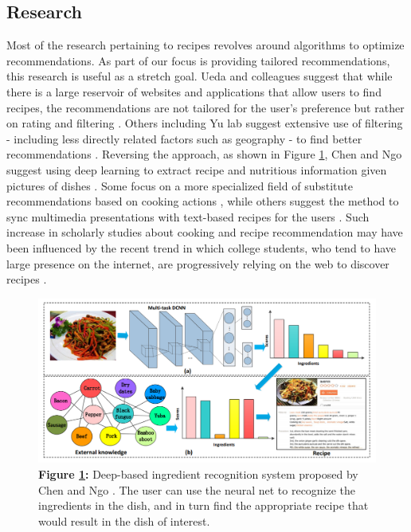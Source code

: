 \documentclass{sigchi}
\begin{document}
\subsection{Research}
	Most of the research pertaining to recipes revolves around algorithms to optimize recommendations. As part of our focus is providing tailored recommendations, this research is useful as a stretch goal. Ueda and colleagues suggest that while there is a large reservoir of websites and applications that allow users to find recipes, the recommendations are not tailored for the user's preference but rather on rating and filtering \cite{ueda}. Others including Yu lab suggest extensive use of filtering - including less directly related factors such as geography - to find better recommendations \cite{yu2011exploring}. Reversing the approach, as shown in Figure \ref{fig:deep}, Chen and Ngo suggest using deep learning to extract recipe and nutritious information given pictures of dishes \cite{chen2016deep}. Some focus on a more specialized field of substitute recommendations based on cooking actions \cite{shidochi2009finding}, while others suggest the method to sync multimedia presentations with text-based recipes for the users \cite{ide2010multimedia,doman2011video}. Such increase in scholarly studies about cooking and recipe recommendation may have been influenced by the recent trend in which college students, who tend to have large presence on the internet, are progressively relying on the web to discover recipes \cite{hertzler2002cooking}.
\begin{figure}[htb!]
	\centering
		\includegraphics[width=0.8\columnwidth]{deep.png}\\
		\textbf{Figure \ref{fig:deep}:} Deep-based ingredient recognition system proposed by Chen and Ngo \cite{chen2016deep}. The user can use the neural net to recognize the ingredients in the dish, and in turn find the appropriate recipe that would result in the dish of interest.
		\label{fig:deep}
\end{figure}
    
\end{document}
